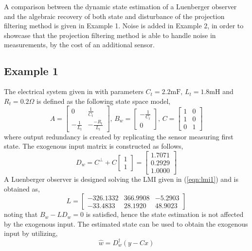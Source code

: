 A comparison between the dynamic state estimation of a Luenberger observer and the algebraic recovery of both state and disturbance of the projection filtering method is given in Example 1. Noise is added in Example 2, in order to showcase that the projection filtering method is able to handle noise in measurements, by the cost of an additional sensor. 
\subsection{Example 1}
The electrical system given in\cite{yang2025output} with parameters $C_t=2.2\mathrm{mF}$, $L_t=1.8\mathrm{mH}$ and $R_t=0.2\Omega$ is defined as the following state space model,
\begin{equation}
A=\begin{bmatrix}
    0& \frac{1}{C_t}\\
    -\frac{1}{L_t}& -\frac{-R_t}{L_t}    
\end{bmatrix},\,
B_w=\begin{bmatrix}
    -\frac{1}{C_t}\\
    0    
\end{bmatrix},\,
C=\begin{bmatrix}
    1& 0\\    
    1& 0\\    
    0& 1    
\end{bmatrix}
\end{equation}
where output redundancy is created by replicating the sensor measuring first state. The exogenous input matrix is constructed as follows,
\begin{equation}
    D_w=C^\perp+C\begin{bmatrix}1\\1\end{bmatrix}=\begin{bmatrix}
    1.7071\\
    0.2929\\
    1.0000
    \end{bmatrix}
\end{equation}
A Luenberger observer is designed solving the LMI given in (\ref{eqn:lmi1}) and is obtained as,
\begin{equation}
    L=\begin{bmatrix}
    -326.1332&  366.9908&   -5.2903\\
    -33.4833&   28.1920&   48.9023
    \end{bmatrix}
\end{equation}
noting that $B_w-LD_w=0$ is satisfied, hence the state estimation is not affected by the exogenous input. The estimated state can be used to obtain the exogenous input by utilizing,
\begin{equation}
    \hat{w}=D_w^\dagger(y-Cx)
\end{equation}

